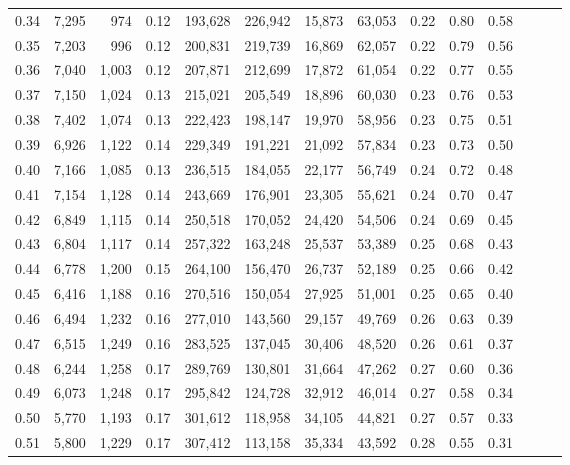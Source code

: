 \begin{tabular}{rrrrrrrrrrrrrr}
0.34 &   7,295 &    974 &  0.12 &  193,628 &  226,942 &  15,873 &  63,053 &  0.22 &  0.80 &      0.58 \\
0.35 &   7,203 &    996 &  0.12 &  200,831 &  219,739 &  16,869 &  62,057 &  0.22 &  0.79 &      0.56 \\
0.36 &   7,040 &  1,003 &  0.12 &  207,871 &  212,699 &  17,872 &  61,054 &  0.22 &  0.77 &      0.55 \\
0.37 &   7,150 &  1,024 &  0.13 &  215,021 &  205,549 &  18,896 &  60,030 &  0.23 &  0.76 &      0.53 \\
0.38 &   7,402 &  1,074 &  0.13 &  222,423 &  198,147 &  19,970 &  58,956 &  0.23 &  0.75 &      0.51 \\
0.39 &   6,926 &  1,122 &  0.14 &  229,349 &  191,221 &  21,092 &  57,834 &  0.23 &  0.73 &      0.50 \\
0.40 &   7,166 &  1,085 &  0.13 &  236,515 &  184,055 &  22,177 &  56,749 &  0.24 &  0.72 &      0.48 \\
0.41 &   7,154 &  1,128 &  0.14 &  243,669 &  176,901 &  23,305 &  55,621 &  0.24 &  0.70 &      0.47 \\
0.42 &   6,849 &  1,115 &  0.14 &  250,518 &  170,052 &  24,420 &  54,506 &  0.24 &  0.69 &      0.45 \\
0.43 &   6,804 &  1,117 &  0.14 &  257,322 &  163,248 &  25,537 &  53,389 &  0.25 &  0.68 &      0.43 \\
0.44 &   6,778 &  1,200 &  0.15 &  264,100 &  156,470 &  26,737 &  52,189 &  0.25 &  0.66 &      0.42 \\
0.45 &   6,416 &  1,188 &  0.16 &  270,516 &  150,054 &  27,925 &  51,001 &  0.25 &  0.65 &      0.40 \\
0.46 &   6,494 &  1,232 &  0.16 &  277,010 &  143,560 &  29,157 &  49,769 &  0.26 &  0.63 &      0.39 \\
0.47 &   6,515 &  1,249 &  0.16 &  283,525 &  137,045 &  30,406 &  48,520 &  0.26 &  0.61 &      0.37 \\
0.48 &   6,244 &  1,258 &  0.17 &  289,769 &  130,801 &  31,664 &  47,262 &  0.27 &  0.60 &      0.36 \\
0.49 &   6,073 &  1,248 &  0.17 &  295,842 &  124,728 &  32,912 &  46,014 &  0.27 &  0.58 &      0.34 \\
0.50 &   5,770 &  1,193 &  0.17 &  301,612 &  118,958 &  34,105 &  44,821 &  0.27 &  0.57 &      0.33 \\
0.51 &   5,800 &  1,229 &  0.17 &  307,412 &  113,158 &  35,334 &  43,592 &  0.28 &  0.55 &      0.31 \\

\end{tabular}
